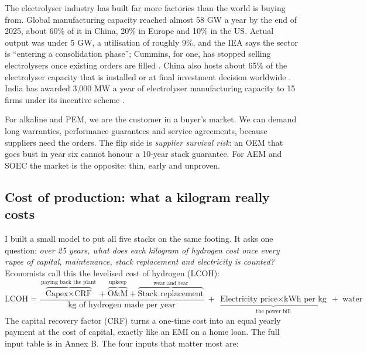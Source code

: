 The electrolyser industry has built far more factories than the world is buying from. Global manufacturing capacity reached almost 58 GW a year by the end of 2025, about 60\% of it in China, 20\% in Europe and 10\% in the US. Actual output was under 5 GW, a utilisation of roughly 9\%, and the IEA says the sector is ``entering a consolidation phase''; Cummins, for one, has stopped selling electrolysers once existing orders are filled \cite{argus2026}. China also hosts about 65\% of the electrolyser capacity that is installed or at final investment decision worldwide \cite{ieanews2025}. India has awarded 3,000 MW a year of electrolyser manufacturing capacity to 15 firms under its incentive scheme \cite{rw2025}. \confH

\begin{finding}
For alkaline and PEM, we are the customer in a buyer's market. We can demand long warranties, performance guarantees and service agreements, because suppliers need the orders. The flip side is \emph{supplier survival risk}: an OEM that goes bust in year six cannot honour a 10-year stack guarantee. For AEM and SOEC the market is the opposite: thin, early and unproven. \confM
\end{finding}

\subsection{Cost of production: what a kilogram really costs}\label{sec:cost}

I built a small model to put all five stacks on the same footing. It asks one question: \emph{over 25 years, what does each kilogram of hydrogen cost once every rupee of capital, maintenance, stack replacement and electricity is counted?} Economists call this the levelised cost of hydrogen (LCOH):
\[
\text{LCOH} = \frac{\overbrace{\text{Capex}\times\text{CRF}}^{\text{paying back the plant}} + \overbrace{\text{O\&M}}^{\text{upkeep}} + \overbrace{\text{Stack replacement}}^{\text{wear and tear}}}{\text{kg of hydrogen made per year}} \;+\; \underbrace{\text{Electricity price}\times\text{kWh per kg}}_{\text{the power bill}} \;+\; \text{water}
\]
The capital recovery factor (CRF) turns a one-time cost into an equal yearly payment at the cost of capital, exactly like an EMI on a home loan. The full input table is in Annex B. The four inputs that matter most are:


